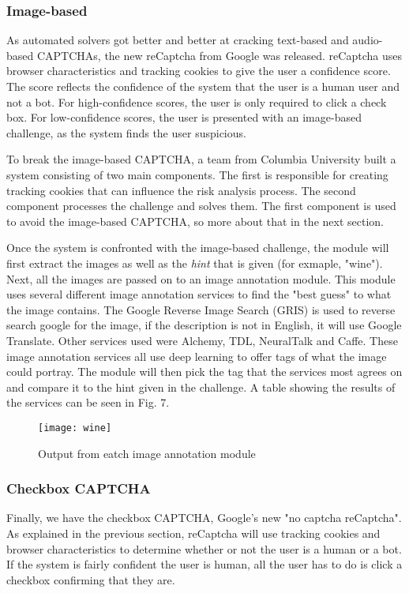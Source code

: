 \documentclass[a4paper]{IEEEtran}
\begin{document}
\subsubsection{Image-based}
As automated solvers got better and better at cracking text-based and audio-based CAPTCHAs, the new reCaptcha from Google was released. reCaptcha uses browser characteristics and tracking cookies to give the user a confidence score. The score reflects the confidence of the system that the user is a human user and not a bot. For high-confidence scores, the user is only required to click a check box. For low-confidence scores, the user is presented with an image-based challenge, as the system finds the user suspicious. 

To break the image-based CAPTCHA, a team from Columbia University built a system consisting of two main components\cite{columbia}. The first is responsible for creating tracking cookies that can influence the risk analysis process. The second component processes the challenge and solves them. The first component is used to avoid the image-based CAPTCHA, so more about that in the next section.

Once the system is confronted with the image-based challenge, the module will first extract the images as well as the \textit{hint} that is given (for exmaple, "wine"). Next, all the images are passed on to an image annotation module. This module uses several different image annotation services to find the "best guess" to what the image contains. The Google Reverse Image Search (GRIS) is used to reverse search google for the image, if the description is not in English, it will use Google Translate. Other services used were Alchemy, TDL, NeuralTalk and Caffe. These image annotation services all use deep learning to offer tags of what the image could portray. The module will then pick the tag that the services most agrees on and compare it to the hint given in the challenge. A table showing the results of the services can be seen in Fig. 7. 

\begin{figure}
\center
\texttt{[image: wine]}
\caption[Image annotation modules]{Output from eatch image annotation module\cite{wine}}
\label{Image annotation modules}
\end{figure}

\subsubsection{Checkbox CAPTCHA}
Finally, we have the checkbox CAPTCHA, Google's new "no captcha reCaptcha". As explained in the previous section, reCaptcha will use tracking cookies and browser characteristics to determine whether or not the user is a human or a bot. If the system is fairly confident the user is human, all the user has to do is click a checkbox confirming that they are.
\end{document}
